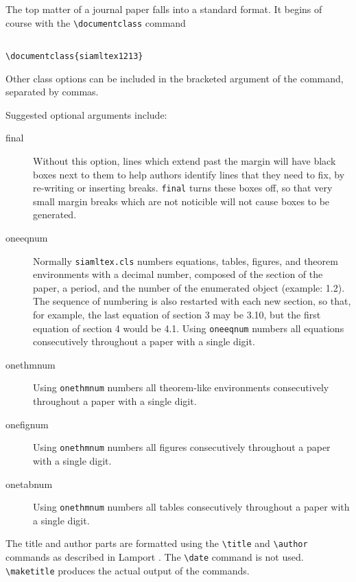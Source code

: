 \documentclass[final,leqno,onefignum,onetabnum]{siamltex1213}
\begin{document}
The top matter of a journal paper falls into a standard
format. It begins of course with the \verb|\documentclass| command

\begin{verbatim}

\documentclass{siamltex1213}

\end{verbatim}

Other class options  can be included
in the bracketed argument of the command, separated by commas.

Suggested optional arguments include:
\begin{description}
\item[final] Without this option, lines which extend past the
margin will have black boxes next to them to help authors identify
lines that they need to fix, by re-writing or inserting breaks. \verb|final|
turns these boxes off, so that very small margin breaks which are not
noticible will not cause boxes to be generated.

\item[oneeqnum] Normally \verb|siamltex.cls| numbers equations,
tables, figures, and theorem environments with a decimal number, 
composed of the section of the paper, a period, and the number of
the enumerated object (example: 1.2). The sequence of numbering
is also restarted with each new section, so that, for example, the last
equation of section 3 may be 3.10, but the first equation of section
4 would be 4.1. Using \verb|oneeqnum| numbers all equations consecutively
throughout a paper with a single digit.

\item[onethmnum] Using \verb|onethmnum| numbers all theorem-like
environments consecutively throughout a paper with a single digit.

\item[onefignum] Using \verb|onethmnum| numbers all figures
 consecutively throughout a paper with a single digit.

\item[onetabnum] Using \verb|onethmnum| numbers all tables
 consecutively throughout a paper with a single digit.
\end{description}

The title and author parts are formatted using the
\verb|\title| and \verb|\author| commands as described in Lamport
\cite{Lamport}. The \verb|\date|
command is not used. \verb|\maketitle| produces the actual
output of the commands.
\end{document}

